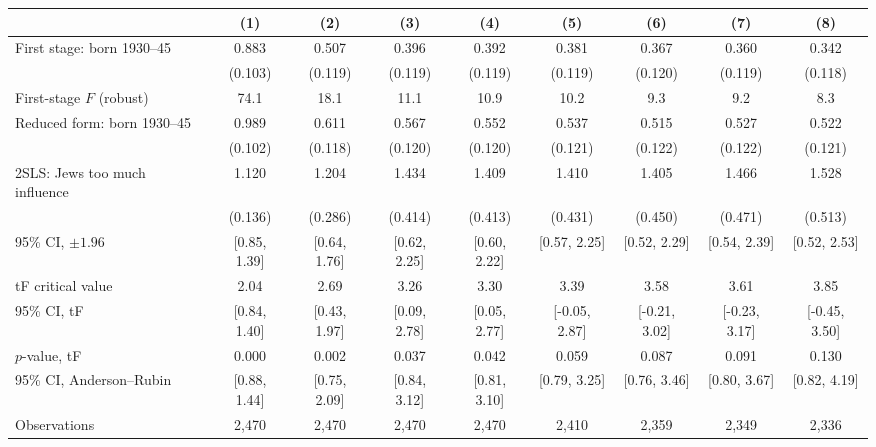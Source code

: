 \begin{tabular}{lcccccccc}
\toprule
 & (1) & (2) & (3) & (4) & (5) & (6) & (7) & (8) \\
\midrule
First stage: born 1930--45 & 0.883 & 0.507 & 0.396 & 0.392 & 0.381 & 0.367 & 0.360 & 0.342 \\
 & (0.103) & (0.119) & (0.119) & (0.119) & (0.119) & (0.120) & (0.119) & (0.118) \\
First-stage $F$ (robust) & 74.1 & 18.1 & 11.1 & 10.9 & 10.2 & 9.3 & 9.2 & 8.3 \\
Reduced form: born 1930--45 & 0.989 & 0.611 & 0.567 & 0.552 & 0.537 & 0.515 & 0.527 & 0.522 \\
 & (0.102) & (0.118) & (0.120) & (0.120) & (0.121) & (0.122) & (0.122) & (0.121) \\
\midrule
2SLS: Jews too much influence & 1.120 & 1.204 & 1.434 & 1.409 & 1.410 & 1.405 & 1.466 & 1.528 \\
 & (0.136) & (0.286) & (0.414) & (0.413) & (0.431) & (0.450) & (0.471) & (0.513) \\
95\% CI, $\pm 1.96$ & [0.85, 1.39] & [0.64, 1.76] & [0.62, 2.25] & [0.60, 2.22] & [0.57, 2.25] & [0.52, 2.29] & [0.54, 2.39] & [0.52, 2.53] \\
tF critical value & 2.04 & 2.69 & 3.26 & 3.30 & 3.39 & 3.58 & 3.61 & 3.85 \\
95\% CI, tF & [0.84, 1.40] & [0.43, 1.97] & [0.09, 2.78] & [0.05, 2.77] & [-0.05, 2.87] & [-0.21, 3.02] & [-0.23, 3.17] & [-0.45, 3.50] \\
$p$-value, tF & 0.000 & 0.002 & 0.037 & 0.042 & 0.059 & 0.087 & 0.091 & 0.130 \\
95\% CI, Anderson--Rubin & [0.88, 1.44] & [0.75, 2.09] & [0.84, 3.12] & [0.81, 3.10] & [0.79, 3.25] & [0.76, 3.46] & [0.80, 3.67] & [0.82, 4.19] \\
\midrule
Observations & 2,470 & 2,470 & 2,470 & 2,470 & 2,410 & 2,359 & 2,349 & 2,336 \\
\bottomrule
\end{tabular}
